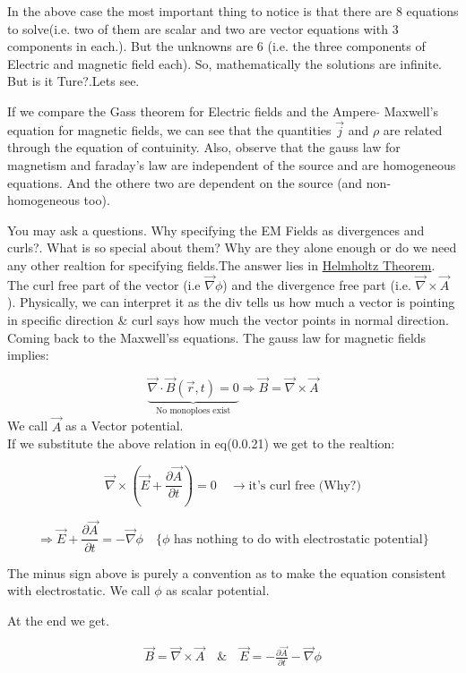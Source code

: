 \documentclass[a4paper]{article}
\numberwithin{equation}{subsection}  %
\begin{document}
In the above case the most important thing to notice is that there are 8 equations to solve(i.e. two of them are scalar and two are vector equations with 3 components in  each.). But the unknowns are 6 (i.e. the three components of Electric and magnetic field each). So, mathematically the solutions are infinite. But is it Ture?.Lets see.

 If we compare the Gass theorem for Electric fields and the Ampere $\tilde{}$ Maxwell's equation for magnetic fields, we can see that the quantities $\vec{j}$ and $\rho$ are related through the equation of contuinity. Also, observe that the gauss law for magnetism and faraday's law are independent of the source and are homogeneous equations. And the othere two are dependent on the source (and non-homogeneous too).  
 
You may ask a questions. Why specifying the EM Fields as divergences and curls?. What is so special about them? Why are they alone enough or do we need any other realtion for specifying fields.The answer lies in \href{https://en.wikipedia.org/wiki/Helmholtz_decomposition}{Helmholtz Theorem}. The curl free part of the vector (i.e $\vec{\nabla} \phi$) and the divergence free part (i.e. $ \vec{\nabla} \times \vec{A}$ ). Physically, we can interpret it as the div tells us how much 
a vector is pointing in specific direction \& curl says how much the vector points in normal direction.\\ Coming back to the Maxwell'ss equations. The gauss law for magnetic fields implies:

$$ \underbrace{\vec{\nabla}\cdot \vec{B} (\vec{r},t)= 0}_{\text{No monoploes exist}} \Rightarrow \vec{B} = \vec{\nabla}\times \vec{A}$$
We call $\vec{A}$ as a Vector potential.\\
If we substitute the above relation in eq(0.0.21) we get to the realtion:


$$ \vec{\nabla} \times \left(\vec{E} + \frac{\partial \vec{A}}{\partial t}\right) = 0 \quad \rightarrow \text{it's curl free (Why?)}$$

$$ \Rightarrow \vec{E} + \frac{\partial \vec{A}}{\partial t} =   - \vec{\nabla} \phi \quad \{ \text{$\phi$ has nothing to do with electrostatic potential} \} $$                   

The minus sign above is purely a convention as to make the equation consistent with electrostatic. We call $\phi$ as scalar potential.

At the end we get.

\begin{gather}
	\vec{B} = \vec{\nabla} \times \vec{A} \quad \& \quad \vec{E} = - \frac{\partial \vec{A}}{\partial t}   - \vec{\nabla} \phi 	
	\label{potentials}
\end{gather}
\end{document}
